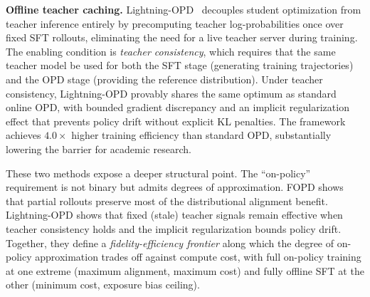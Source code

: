\documentclass{article} %
\begin{document}
\textbf{Offline teacher caching.} Lightning-OPD~\citep{2604.13010} decouples student optimization from teacher inference entirely by precomputing teacher log-probabilities once over fixed SFT rollouts, eliminating the need for a live teacher server during training. The enabling condition is \emph{teacher consistency}, which requires that the same teacher model be used for both the SFT stage (generating training trajectories) and the OPD stage (providing the reference distribution). Under teacher consistency, Lightning-OPD provably shares the same optimum as standard online OPD, with bounded gradient discrepancy and an implicit regularization effect that prevents policy drift without explicit KL penalties. The framework achieves $4.0\times$ higher training efficiency than standard OPD, substantially lowering the barrier for academic research.

These two methods expose a deeper structural point. The ``on-policy'' requirement is not binary but admits degrees of approximation. FOPD shows that partial rollouts preserve most of the distributional alignment benefit. Lightning-OPD shows that fixed (stale) teacher signals remain effective when teacher consistency holds and the implicit regularization bounds policy drift. Together, they define a \emph{fidelity-efficiency frontier} along which the degree of on-policy approximation trades off against compute cost, with full on-policy training at one extreme (maximum alignment, maximum cost) and fully offline SFT at the other (minimum cost, exposure bias ceiling).
\end{document}

